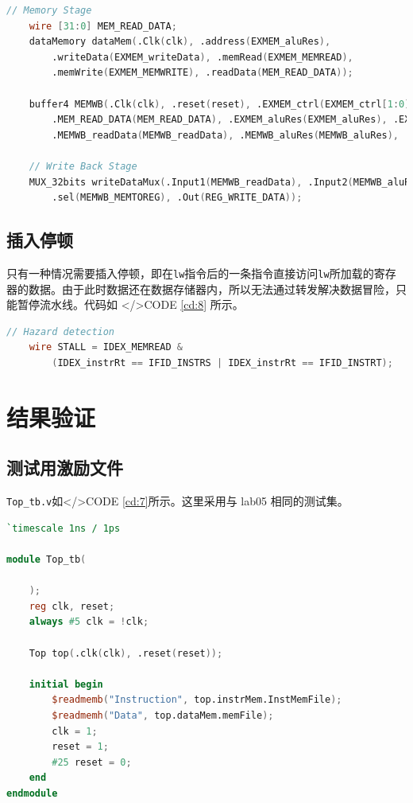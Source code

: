 \documentclass{progartcn}
\begin{document}
\begin{lstlisting}[language=verilog,caption={访存和写回},label={cd:7}]
    // Memory Stage
    wire [31:0] MEM_READ_DATA;
    dataMemory dataMem(.Clk(clk), .address(EXMEM_aluRes), 
        .writeData(EXMEM_writeData), .memRead(EXMEM_MEMREAD), 
        .memWrite(EXMEM_MEMWRITE), .readData(MEM_READ_DATA));

    buffer4 MEMWB(.Clk(clk), .reset(reset), .EXMEM_ctrl(EXMEM_ctrl[1:0]),
        .MEM_READ_DATA(MEM_READ_DATA), .EXMEM_aluRes(EXMEM_aluRes), .EXMEM_dstReg(EXMEM_dstReg),
        .MEMWB_readData(MEMWB_readData), .MEMWB_aluRes(MEMWB_aluRes), .MEMWB_dstReg(MEMWB_dstReg), .MEMWB_ctrl(MEMWB_ctrl));
    
    // Write Back Stage
    MUX_32bits writeDataMux(.Input1(MEMWB_readData), .Input2(MEMWB_aluRes), 
        .sel(MEMWB_MEMTOREG), .Out(REG_WRITE_DATA));
\end{lstlisting}

\subsection{插入停顿}

只有一种情况需要插入停顿，即在\verb|lw|指令后的一条指令直接访问\verb|lw|所加载的寄存器的数据。由于此时数据还在数据存储器内，所以无法通过转发解决数据冒险，只能暂停流水线。代码如 </>CODE \ref{cd:8} 所示。

\begin{lstlisting}[language=verilog,caption={插入停顿},label={cd:8}]
// Hazard detection
    wire STALL = IDEX_MEMREAD & 
        (IDEX_instrRt == IFID_INSTRS | IDEX_instrRt == IFID_INSTRT);
\end{lstlisting}

\section{结果验证}

\subsection{测试用激励文件}

\verb|Top_tb.v|如</>CODE \ref{cd:7}所示。这里采用与 lab05 相同的测试集。

\begin{lstlisting}[language=verilog,caption={Top\_tb.v},label={cd:8}]
`timescale 1ns / 1ps

module Top_tb(

    );
    reg clk, reset;
    always #5 clk = !clk;
    
    Top top(.clk(clk), .reset(reset));
    
    initial begin
        $readmemb("Instruction", top.instrMem.InstMemFile);
        $readmemh("Data", top.dataMem.memFile);
        clk = 1;
        reset = 1;
        #25 reset = 0;
    end
endmodule
\end{lstlisting}
\end{document}
